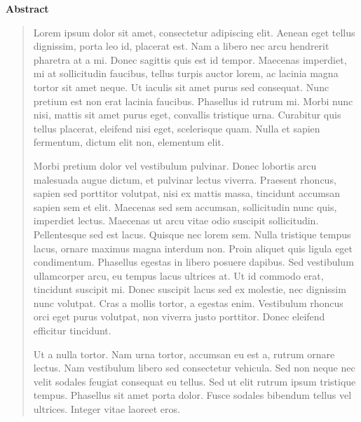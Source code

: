 \vspace*{2cm}
\thispagestyle{empty}
{\bfseries \Huge Abstract }
\vspace{1.5cm}

\begin{quotation}
Lorem ipsum dolor sit amet, consectetur adipiscing elit. Aenean eget tellus
dignissim, porta leo id, placerat est. Nam a libero nec arcu hendrerit pharetra
at a mi. Donec sagittis quis est id tempor. Maecenas imperdiet, mi at
sollicitudin faucibus, tellus turpis auctor lorem, ac lacinia magna tortor sit
amet neque. Ut iaculis sit amet purus sed consequat. Nunc pretium est non erat
lacinia faucibus. Phasellus id rutrum mi. Morbi nunc nisi, mattis sit amet
purus eget, convallis tristique urna. Curabitur quis tellus placerat, eleifend
nisi eget, scelerisque quam. Nulla et sapien fermentum, dictum elit non,
elementum elit.

Morbi pretium dolor vel vestibulum pulvinar. Donec lobortis arcu malesuada
augue dictum, et pulvinar lectus viverra. Praesent rhoncus, sapien sed
porttitor volutpat, nisi ex mattis massa, tincidunt accumsan sapien sem et
elit. Maecenas sed sem accumsan, sollicitudin nunc quis, imperdiet lectus.
Maecenas ut arcu vitae odio suscipit sollicitudin. Pellentesque sed est lacus.
Quisque nec lorem sem. Nulla tristique tempus lacus, ornare maximus magna
interdum non. Proin aliquet quis ligula eget condimentum. Phasellus egestas in
libero posuere dapibus. Sed vestibulum ullamcorper arcu, eu tempus lacus
ultrices at. Ut id commodo erat, tincidunt suscipit mi. Donec suscipit lacus
sed ex molestie, nec dignissim nunc volutpat. Cras a mollis tortor, a egestas
enim. Vestibulum rhoncus orci eget purus volutpat, non viverra justo porttitor.
Donec eleifend efficitur tincidunt.

Ut a nulla tortor. Nam urna tortor, accumsan eu est a, rutrum ornare lectus.
Nam vestibulum libero sed consectetur vehicula. Sed non neque nec velit sodales
feugiat consequat eu tellus. Sed ut elit rutrum ipsum tristique tempus.
Phasellus sit amet porta dolor. Fusce sodales bibendum tellus vel ultrices.
Integer vitae laoreet eros.



\end{quotation}
